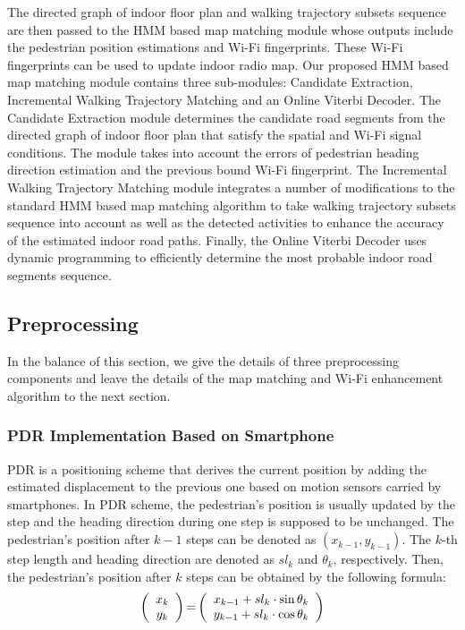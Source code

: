 \documentclass[conference]{IEEEtran}
\begin{document}
The directed graph of indoor floor plan and walking trajectory subsets sequence are then passed to the HMM based map matching module whose outputs include the pedestrian position estimations and Wi-Fi fingerprints. These Wi-Fi fingerprints can be used to update indoor radio map. Our proposed HMM based map matching module contains three sub-modules: Candidate Extraction, Incremental Walking Trajectory Matching and an Online Viterbi Decoder. The Candidate Extraction module determines the candidate road segments from the directed graph of indoor floor plan that satisfy the spatial and Wi-Fi signal conditions. The module takes into account the errors of pedestrian heading direction estimation and the previous bound Wi-Fi fingerprint. The Incremental Walking Trajectory Matching module integrates a number of modifications to the standard HMM based map matching algorithm to take walking trajectory subsets sequence into account as well as the detected activities to enhance the accuracy of the estimated indoor road paths. Finally, the Online Viterbi Decoder uses dynamic programming to efficiently determine the most probable indoor road segments sequence.

\subsection{Preprocessing}

In the balance of this section, we give the details of three preprocessing components and leave the details of the map matching and Wi-Fi enhancement algorithm to the next section.

\subsubsection{PDR Implementation Based on Smartphone}

PDR is a positioning scheme that derives the current position by adding the estimated displacement to the previous one based on motion sensors carried by smartphones. In PDR scheme, the pedestrian's position is usually updated by the step and the heading direction during one step is supposed to be unchanged. The pedestrian's position after $k-1$ steps can be denoted as $(x_{k-1},y_{k-1})$. The $k$-th step length and heading direction are denoted as $sl_k$ and $\theta_k$, respectively. Then, the pedestrian's position after $k$ steps can be obtained by the following formula:
\begin{equation}
	\label{equ_pdr}
	\left( {\begin{array}{*{20}{c}}
		{{x_k}}\\
		{{y_k}}
		\end{array}} \right){\rm{ = }}\left( {\begin{array}{*{20}{c}}
		{{x_{k - 1}} + s{l_k} \cdot \sin {\theta _k}}\\
		{{y_{k - 1}} + s{l_k} \cdot \cos {\theta _k}}
		\end{array}} \right)
\end{equation}
\end{document}
